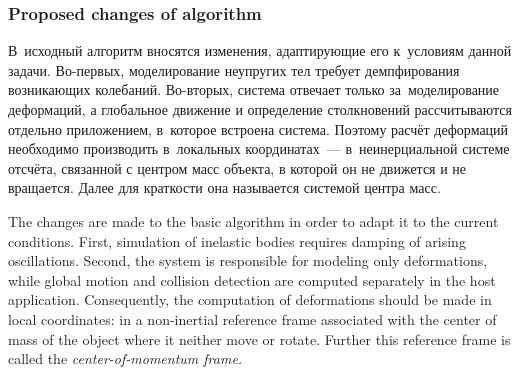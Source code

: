 \documentclass[a4paper, 12pt, titlepage]{extarticle}
\begin{document}
      \subsubsection{Proposed changes of algorithm}\label{sssec:proposed_changes}

\begin{original}
        В~исходный алгоритм вносятся изменения, адаптирующие его к~условиям данной
        задачи. Во-первых, моделирование неупругих тел требует демпфирования возникающих колебаний.
        Во-вторых, система отвечает только за~моделирование деформаций, а глобальное движение и
        определение столкновений рассчитываются отдельно приложением, в~которое встроена система.
        Поэтому расчёт деформаций необходимо производить в~локальных координатах~---
        в~неинерциальной системе отсчёта, связанной с центром масс объекта, в которой он не
        движется и не вращается. Далее для краткости она называется системой центра масс.
\end{original}

        The changes are made to the basic algorithm in order to adapt it to the current conditions.
        First, simulation of inelastic bodies requires damping of arising oscillations. Second, the
        system is responsible for modeling only deformations, while global motion and collision
        detection are computed separately in the host application. Consequently, the computation of
        deformations should be made in local coordinates: in a non-inertial reference frame
        associated with the center of mass of the object where it neither move or rotate. Further
        this reference frame is called the \emph{center-of-momentum frame.}
\end{document}
